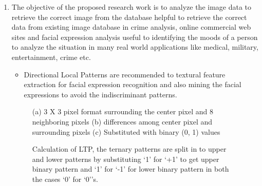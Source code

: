 \documentclass[review]{elsarticle}
\begin{document}
\begin{enumerate}
	\item The objective of the proposed research work is to analyze the image data to retrieve the correct image from the database helpful to retrieve the correct data from existing image database in crime analysis, online commercial web sites and facial expression analysis useful to identifying the moods of a person to analyze the situation in many real world applications like medical, military, entertainment, crime etc.
	\begin{itemize}
		\item  Directional Local Patterns are recommended to textural feature extraction for facial expression recognition and also mining the facial expressions to avoid the indiscriminant patterns.	
	\end{itemize}
	
	
	\begin{figure}
		\centering
		\caption{(a) 3 X 3 pixel format surrounding the center pixel and 8 neighboring pixels (b) differences among   center pixel and surrounding pixels (c) Substituted with binary (0, 1) values}
		\label{fig:fig1}
	\end{figure}
	
	\begin{figure}
		\centering
		\caption{Calculation of LTP, the ternary patterns are split in to upper and lower patterns by substituting ‘1’ for ‘+1’ to get upper binary pattern and ‘1’ for ‘-1’ for lower binary pattern in both the cases ‘0’ for ‘0’’s.}
		\label{fig:fig2}
	\end{figure}
	

\end{enumerate}
\end{document}
